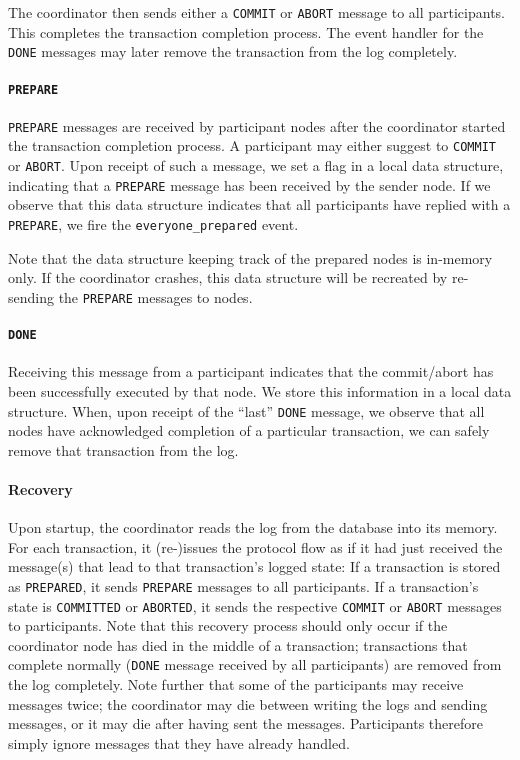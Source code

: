 \documentclass{article}
\begin{document}
\begin{multicols}{2}
The coordinator then sends either a \texttt{COMMIT} or
\texttt{\texttt{ABORT}} message to all participants. 
This completes the transaction completion process.
The event handler for the \texttt{DONE} messages may later 
remove the transaction from the log completely.

\paragraph{\texttt{PREPARE}} \texttt{PREPARE} messages are
received by participant nodes after the coordinator
started the transaction completion process. A participant
may either suggest to \texttt{COMMIT} or \texttt{ABORT}.
Upon receipt of such a message, we set a flag in a local
data structure, indicating that a \texttt{PREPARE} message
has been received by the sender node. If we observe that
this data structure indicates that all participants have
replied with a \texttt{PREPARE}, we fire the
\texttt{everyone\_prepared} event.

Note that the data structure keeping track of the prepared
nodes is in-memory only. If the coordinator crashes, this
data structure will be recreated by re-sending the 
\texttt{PREPARE} messages to nodes.

\paragraph{\texttt{DONE}} Receiving this message from a 
participant indicates that the commit/abort has been
successfully executed by that node. We store this
information in a  local data structure. When, upon receipt 
of the ``last'' \texttt{DONE} message, we observe that
all nodes have acknowledged completion of a particular 
transaction, we can safely remove that transaction from the
log.

\paragraph{Recovery} 
Upon startup, the coordinator reads the log from the
database into its memory. For each transaction, it
(re-)issues the protocol flow as if it had just received
the message(s) that lead to that transaction's logged
state: If a transaction is
stored as \texttt{PREPARED}, it sends \texttt{PREPARE}
messages to all participants. If a
transaction's state is \texttt{COMMITTED} or
\texttt{ABORTED}, it sends the respective \texttt{COMMIT}
or \texttt{ABORT} messages to participants. Note that this
recovery process should only occur if the coordinator node
has died in the middle of a transaction; transactions that
complete normally (\texttt{DONE} message received by all
participants)
are removed from the log completely. Note further that some
of the participants may receive messages twice; the 
coordinator may die between writing the logs and sending
messages, or it may die after having sent the messages. 
Participants therefore simply ignore messages that they
have already handled.


\end{multicols}
\end{document}

